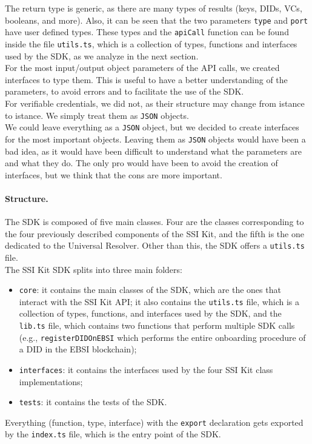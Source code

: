 The return type is generic, as there are many types of results (keys, DIDs, VCs,
booleans, and more). Also, it can be seen that the two parameters \texttt{type} and
\texttt{port} have user defined types. These types and the \texttt{apiCall} function 
can be found inside the file \texttt{utils.ts}, which is a collection of types, 
functions and interfaces used by the SDK, as we analyze in the next section.
\vspace{0.3cm}\\
For the most input/output object parameters of the API calls, we created interfaces
to type them. This is useful to have a better understanding of the parameters, to 
avoid errors and to facilitate the use of the SDK.\\
For verifiable credentials, we did not, as their structure may change from istance
to istance. We simply treat them as \texttt{JSON} objects.\\
We could leave everything as a \texttt{JSON} object, but we decided to create interfaces for
the most important objects. Leaving them as \texttt{JSON} objects would have been a bad idea,
as it would have been difficult to understand what the parameters are and what they
do. The only pro would have been to avoid the creation of interfaces, but we think
that the cons are more important.

\paragraph{Structure.}
The SDK is composed of five main classes. Four are the classes corresponding to the 
four previously described components of the SSI Kit, and the fifth is the one dedicated
to the Universal Resolver. Other than this, the SDK offers a \texttt{utils.ts} file.
\vspace{0.3cm}\\
The SSI Kit SDK splits into three main folders:
\begin{itemize}
    \item \texttt{core}: it contains the main classes of the SDK, which are the
    ones that interact with the SSI Kit API; it also contains the \texttt{utils.ts}
    file, which is a collection of types, functions, and interfaces used by the SDK,
    and the \texttt{lib.ts} file, which contains two functions that perform multiple
    SDK calls (e.g., \texttt{registerDIDOnEBSI} which performs the entire onboarding
    procedure of a DID in the EBSI blockchain);
    \item \texttt{interfaces}: it contains the interfaces used by the four SSI Kit
    class implementations;
    \item \texttt{tests}: it contains the tests of the SDK.
\end{itemize}
Everything (function, type, interface) with the \texttt{export} declaration gets exported by the \texttt{index.ts}
file, which is the entry point of the SDK.

